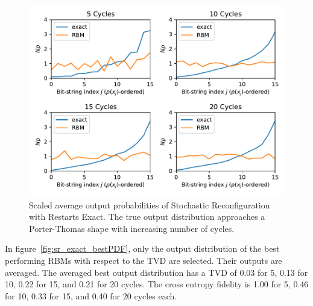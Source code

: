 \begin{figure}[H]
  \centering
  \includegraphics[width=\textwidth]{figures/results/SR-restarts-not-learned/avgPDF.pdf}
  \caption[Scaled average output probabilities of Stochastic Reconfiguration with Restarts Exact]{
    Scaled average output probabilities of Stochastic Reconfiguration with Restarts Exact. The true 
    output distribution approaches a Porter-Thomas shape with increasing number of cycles.}
  \label{fig:sr_exact_avgPDF}
\end{figure}

In figure~\ref{fig:sr_exact_bestPDF}, only the output distribution of the best performing RBMs with respect to the 
TVD are selected. Their outputs are averaged. The averaged best output distribution 
has a TVD of 0.03 for 5, 0.13 for 10, 0.22 for 15, and 0.21 for 20 
cycles. The cross entropy fidelity is 1.00 for 5, 0.46 for 10, 0.33 for 15, and 0.40 for 20 cycles each. 


